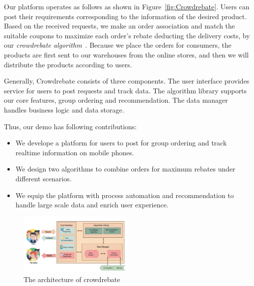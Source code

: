 Our platform operates as follows as shown in Figure~\ref{fig:Crowdrebate}. Users can post their requirements corresponding to the information of the desired product. Based on the received requests, we make an order association and match the suitable coupons to maximize each order's rebate deducting the delivery costs, by our \emph{crowdrebate algorithm}~\cite{Report}. Because we place the orders for consumers, the products are first sent to our warehouses from the online stores, and then we will distribute the products according to users.

Generally, Crowdrebate consists of three components. The user interface provides service for users to post requests and track data. The algorithm library supports our core features, group ordering and recommendation. The data manager handles business logic and data storage.

Thus, our demo has following contributions:
\begin{itemize}
	\item We develope a platform for users to post for group ordering and track realtime information on mobile phones.
	\item We design two algorithms to combine orders for maximum rebates under different scenarios.
	\item We equip the platform with process automation and recommendation to handle large scale data and enrich user experience.
\end{itemize}
\begin{figure}[t] \vspace{-2ex}
	\centering %
	\includegraphics[width=0.5\textwidth]{../figure/ar.png} %
	\caption{The architecture of crowdrebate} %
	\label{fig:ar} %

\end{figure}

